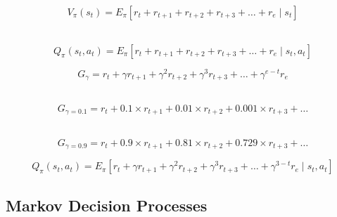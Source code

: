\documentclass[xcolor={table}]{beamer}
\begin{document}
 \begin{frame} 
\begin{equation}
V_{\pi}(s_t) = E_{\pi}[r_t + r_{t+1}+r_{t+2} +r_{t+3} + \ldots +r_{e} \mid s_t]
\label{eqn:value_function}
\end{equation}

~\\

\begin{equation}
Q_{\pi}(s_t, a_t) = E_{\pi}[r_t + r_{t+1}+r_{t+2} +r_{t+3} + \ldots +r_{e} \mid s_t, a_t]
\label{eqn:action_value_function}
\end{equation}
\end{frame} 



 \begin{frame} 
\begin{equation}
G_{\gamma} = r_t + \gamma r_{t+1}+ \gamma^2 r_{t+2} + \gamma^3 r_{t+3} + \ldots + \gamma^{e-t} r_{e}
\label{eqn:discount_return_def}
\end{equation}

~\\

\begin{equation*}
G_{\gamma=0.1} = r_t + 0.1 \times r_{t+1}+  0.01 \times r_{t+2} + 0.001 \times r_{t+3} + \ldots
\end{equation*}

~\\

\begin{equation*}
G_{\gamma=0.9} = r_t + 0.9 \times r_{t+1}+  0.81 \times r_{t+2} + 0.729 \times r_{t+3} + \ldots
\end{equation*}
\end{frame} 



 \begin{frame} 
\begin{equation}
Q_{\pi}(s_t, a_t) = E_{\pi}[r_t + \gamma r_{t+1}+\gamma^2 r_{t+2} +\gamma^3 r_{t+3} + \ldots +\gamma^{3-t} r_{e} \mid s_t, a_t]
\label{eqn:discounted_expected_reward}
\end{equation}
\end{frame} 


\subsection{Markov Decision Processes}
\end{document}
